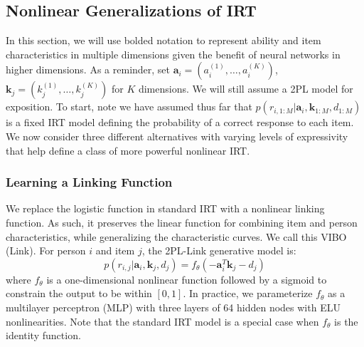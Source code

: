 \subsection{Nonlinear Generalizations of IRT}
In this section, we will use bolded notation to represent ability and item characteristics in multiple dimensions given the benefit of neural networks in higher dimensions. As a reminder, set $\textbf{a}_i = (a^{(1)}_i, \ldots, a^{(K)}_i )$, $\textbf{k}_j = (k^{(1)}_j, \ldots, k^{(K)}_j)$ for $K$ dimensions. We will still assume a 2PL model for exposition. To start, note we have assumed thus far that $p(r_{i,1:M}|\textbf{a}_i,\textbf{k}_{1:M}, d_{1:M})$ is a fixed IRT model defining the probability of a correct response to each item.
We now consider three different alternatives with varying levels of expressivity that help define a class of more powerful nonlinear IRT.

\subsubsection{Learning a Linking Function}
We replace the logistic function in standard IRT with a nonlinear linking function.
As such, it preserves the linear function for combining item and person characteristics, while generalizing the characteristic curves.
We call this VIBO (Link).
For person $i$ and item $j$, the 2PL-Link generative model is:
\begin{equation}
    p(r_{i,j}|\textbf{a}_i,\textbf{k}_j, d_j) =  f_\theta(-\textbf{a}_i^T \textbf{k}_j - d_j)
\end{equation}
where $f_\theta$ is a one-dimensional nonlinear function followed by a sigmoid to constrain the output to be within $[0,1]$.
In practice, we parameterize $f_\theta$ as a multilayer perceptron (MLP) with three layers of 64 hidden nodes with ELU nonlinearities.
Note that the standard IRT model is a special case when $f_\theta$ is the identity function.

